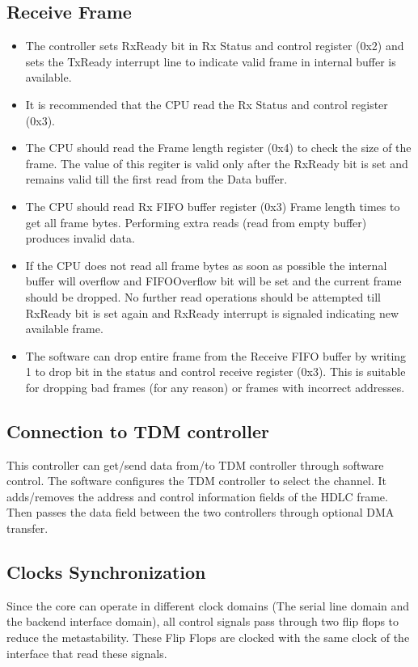 \documentclass[a4paper,11pt]{article}
\begin{document}
\subsection{Receive Frame}
\begin{itemize}
\item The controller sets RxReady bit in Rx Status and control register (0x2) and sets the TxReady interrupt line to indicate valid frame in internal buffer is available.
\item It is recommended that the CPU read the Rx Status and control register (0x3).
\item The CPU should read the Frame length register (0x4) to check the size of the frame. The value of this regiter is valid only after the RxReady bit is set and remains valid till the first read from the Data buffer.
\item The CPU should read Rx FIFO buffer register (0x3) Frame length times to get all frame bytes. Performing extra reads (read from empty buffer) produces invalid data.
\item If the CPU does not read all frame bytes as soon as possible the internal buffer will overflow and FIFOOverflow bit will be set and the current frame should be dropped. No further read operations should be attempted till RxReady bit is set again and RxReady interrupt is signaled indicating new available frame.
\item The software can drop entire frame from the Receive FIFO buffer by writing 1 to drop bit in the status and control receive register (0x3). This is suitable for dropping bad frames (for any reason) or frames with incorrect addresses.
\end{itemize}
 
\subsection{Connection to TDM controller}
This controller can get/send data from/to TDM controller through software control. The software configures the TDM controller to select the channel. It adds/removes the address and control information fields of the HDLC frame. Then passes the data field between the two controllers through optional DMA transfer.
 
\subsection{Clocks Synchronization}
Since the core can operate in different clock domains (The serial line domain and the backend interface domain), all control signals pass through two flip flops to reduce the metastability. These Flip Flops are clocked with the same clock of the interface that read these signals.
 
\end{document}
